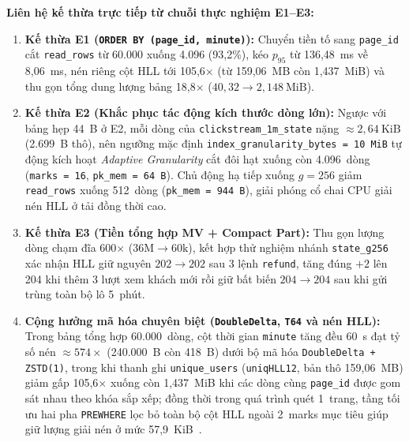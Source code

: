 \documentclass[13pt,a4paper]{report}
\begin{document}
\noindent\textbf{Liên hệ kế thừa trực tiếp từ chuỗi thực nghiệm E1--E3:}
\begin{enumerate}
    \setlength{\itemsep}{3pt}\setlength{\parskip}{0pt}
    \item \textbf{Kế thừa E1 (\texttt{ORDER BY (page\_\allowbreak{}id, minute)}):} Chuyển tiền tố sang \texttt{page\_\allowbreak{}id} cắt \texttt{read\_\allowbreak{}rows} từ 60.000 xuống 4.096 (93,2\%), kéo $p_{95}$ từ 136,48~ms về 8,06~ms, nén riêng cột HLL tới 105,6${\times}$ (từ 159,06~MB còn 1,437~MiB) và thu gọn tổng dung lượng bảng 18,8${\times}$ ($40{,}32 \rightarrow 2{,}148~\text{MiB}$).
    \item \textbf{Kế thừa E2 (Khắc phục tác động kích thước dòng lớn):} Ngược với bảng hẹp 44~B ở E2, mỗi dòng của \texttt{clickstream\_\allowbreak{}1m\_\allowbreak{}state} nặng $\approx 2{,}64~\text{KiB}$ (2.699~B thô), nên ngưỡng mặc định \texttt{index\_\allowbreak{}granularity\_\allowbreak{}bytes = 10~MiB} tự động kích hoạt \textit{Adaptive Granularity} cắt đôi hạt xuống còn 4.096~dòng (\texttt{marks = 16}, \texttt{pk\_\allowbreak{}mem = 64~B}). Chủ động hạ tiếp xuống $g = 256$ giảm \texttt{read\_\allowbreak{}rows} xuống 512~dòng (\texttt{pk\_\allowbreak{}mem = 944~B}), giải phóng cổ chai CPU giải nén HLL ở tải đồng thời cao.
    \item \textbf{Kế thừa E3 (Tiền tổng hợp MV + Compact Part):} Thu gọn lượng dòng chạm đĩa 600${\times}$ ($36\text{M} \rightarrow 60\text{k}$), kết hợp thử nghiệm nhánh \texttt{state\_\allowbreak{}g256} xác nhận HLL giữ nguyên $202 \rightarrow 202$ sau 3 lệnh \texttt{refund}, tăng đúng $+2$ lên 204 khi thêm 3 lượt xem khách mới rồi giữ bất biến $204 \rightarrow 204$ sau khi gửi trùng toàn bộ lô 5~phút.
    \item \textbf{Cộng hưởng mã hóa chuyên biệt (\texttt{DoubleDelta}, \texttt{T64} và nén HLL):} Trong bảng tổng hợp 60.000~dòng, cột thời gian \texttt{minute} tăng đều 60~s đạt tỷ số nén $\approx 574{\times}$ (240.000~B còn 418~B) dưới bộ mã hóa \texttt{DoubleDelta + ZSTD(1)}, trong khi thanh ghi \texttt{unique\_\allowbreak{}users} (\texttt{uniqHLL12}, bản thô 159,06~MB) giảm gấp 105,6${\times}$ xuống còn 1,437~MiB khi các dòng cùng \texttt{page\_\allowbreak{}id} được gom sát nhau theo khóa sắp xếp; đồng thời trong quá trình quét 1~trang, tầng tối ưu hai pha \texttt{PREWHERE} lọc bỏ toàn bộ cột HLL ngoài 2~marks mục tiêu giúp giữ lượng giải nén ở mức 57,9~KiB~\cite{S16, A3}.
\end{enumerate}
\end{document}
